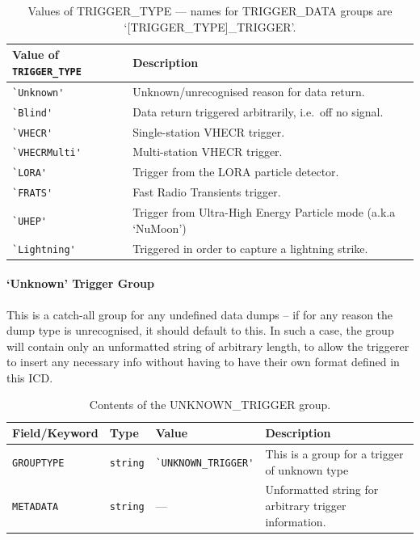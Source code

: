 \documentclass[a4paper,10pt,bibtotoc]{scrartcl}
\begin{document}
\begin{table}[htb]
  \centering
  \begin{tabular}{|lp{9cm}|}
    \hline
    \sc Value of \verb|TRIGGER_TYPE| & Description \\
    \hline \hline
    	\verb|`Unknown'| & Unknown/unrecognised reason for data return. \\
    	\verb|`Blind'| & Data return triggered arbitrarily, i.e.\ off no signal.\\
    	\verb|`VHECR'| & Single-station VHECR trigger.\\
    	\verb|`VHECRMulti'| & Multi-station VHECR trigger.\\
	\verb|`LORA'| & Trigger from the LORA particle detector.\\
    	\verb|`FRATS'| & Fast Radio Transients trigger.\\
    	\verb|`UHEP'| & Trigger from Ultra-High Energy Particle mode (a.k.a `NuMoon')\\
    	\verb|`Lightning'| & Triggered in order to capture a lightning strike.\\
   \hline
  \end{tabular}
  \caption{Values of TRIGGER\_TYPE --- names for TRIGGER\_DATA groups are `[TRIGGER\_TYPE]\_TRIGGER'.}
  \label{tab:dump_meta_types root group}
\end{table}

\paragraph{`Unknown' Trigger Group}

\label{sec:unknown trigger group}

This is a catch-all group for any undefined data dumps -- if for any reason the dump type is unrecognised, it should default to this.
In such a case, the group will contain only an unformatted string of arbitrary length, to allow the triggerer to insert any necessary info without having to have their own format defined in this ICD.


\begin{table}[htbp]
  \centering
  \begin{tabular}{|lllp{7cm}|}
    \hline
    \sc Field/Keyword & \sc Type & \sc Value &  Description \\
    \hline \hline
    {\small\verb|GROUPTYPE|} & \verb|string| & {\small\verb|`UNKNOWN_TRIGGER'|} & 
    This is a group for a trigger of unknown type \\
    {\small\verb|METADATA|} & \verb|string| & --- & Unformatted string for arbitrary trigger information.\\
	\hline
  \end{tabular}
  \caption{Contents of the UNKNOWN\_TRIGGER group.}
\end{table}
\end{document}
